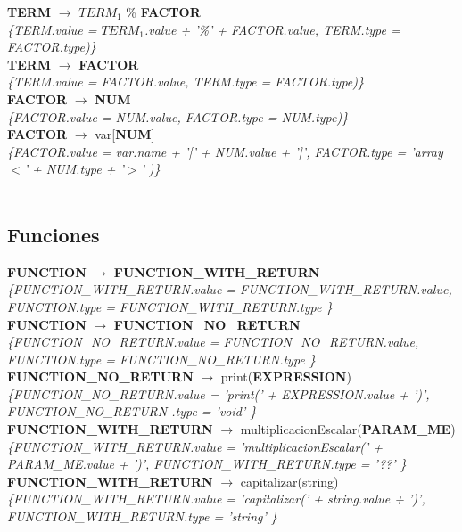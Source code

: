 \documentclass[10pt,a4paper]{article}
\begin{document}
\textbf{TERM} $\rightarrow$ \textbf{$TERM_{1}$} \% \textbf{FACTOR}  \\
\textit{\{TERM.value = $TERM_{1}$.value + '\%' + FACTOR.value, TERM.type = FACTOR.type)\}} \\

\textbf{TERM} $\rightarrow$ \textbf{FACTOR} \\
\textit{\{TERM.value = FACTOR.value, TERM.type = FACTOR.type)\}} \\

\textbf{FACTOR} $\rightarrow$ \textbf{NUM}   \\
\textit{\{FACTOR.value = NUM.value, FACTOR.type = NUM.type)\}} \\

\textbf{FACTOR} $\rightarrow$ var[\textbf{NUM}]  \\ 
\textit{\{FACTOR.value = var.name + '[' + NUM.value + ']', FACTOR.type = 'array$<$' + NUM.type + '$>$' )\}}  \\ 
\\

\subsection{Funciones}
\textbf{FUNCTION} $\rightarrow$ \textbf{FUNCTION\_WITH\_RETURN} \\
\textit{\{FUNCTION\_WITH\_RETURN.value =  FUNCTION\_WITH\_RETURN.value, FUNCTION.type = FUNCTION\_WITH\_RETURN.type \}} \\

\textbf{FUNCTION} $\rightarrow$ \textbf{FUNCTION\_NO\_RETURN} \\
\textit{\{FUNCTION\_NO\_RETURN.value =  FUNCTION\_NO\_RETURN.value, FUNCTION.type = FUNCTION\_NO\_RETURN.type \}} \\

\textbf{FUNCTION\_NO\_RETURN} $\rightarrow$ print(\textbf{EXPRESSION}) \\   
\textit{\{FUNCTION\_NO\_RETURN.value =  'print(' + EXPRESSION.value + ')', FUNCTION\_NO\_RETURN .type = 'void' \}} \\

\textbf{FUNCTION\_WITH\_RETURN} $\rightarrow$ multiplicacionEscalar(\textbf{PARAM\_ME}) \\ 
\textit{\{FUNCTION\_WITH\_RETURN.value =  'multiplicacionEscalar(' + PARAM\_ME.value + ')', FUNCTION\_WITH\_RETURN.type = '??' \}} \\

\textbf{FUNCTION\_WITH\_RETURN} $\rightarrow$ capitalizar(string)   \\
\textit{\{FUNCTION\_WITH\_RETURN.value =  'capitalizar(' + string.value + ')', FUNCTION\_WITH\_RETURN.type = 'string' \}} \\
\end{document}
